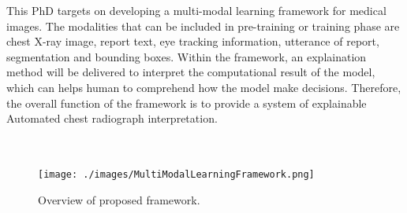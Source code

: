 This PhD targets on developing a multi-modal learning framework for medical images. The modalities that can be included in pre-training or training phase are chest X-ray image, report text, eye tracking information, utterance of report, segmentation and bounding boxes. Within the framework, an explaination method will be delivered to interpret the computational result of the model, which can helps human to comprehend how the model make decisions. Therefore, the overall function of the framework is to provide a system of explainable Automated chest radiograph interpretation. \\
\\
\\


\begin{figure}[!h]
    \centering
    \texttt{[image: ./images/MultiModalLearningFramework.png]}
    \caption{Overview of proposed framework.}
    \label{fig: proposed_framework}
\end{figure}

